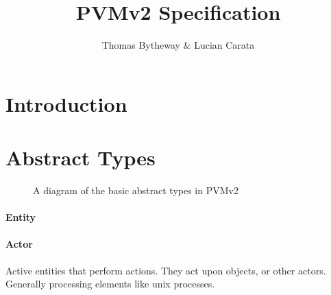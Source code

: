 \documentclass[12pt,twoside,openright,a4paper]{article}
\begin{document}
\title{PVMv2 Specification}
\author{Thomas Bytheway & Lucian Carata}

\begin{minipage}[h]{\textwidth}
    \maketitle
    \vspace{2in}
    {\small}
\end{minipage}

\normalsize



\clearpage

\section{Introduction}

\section{Abstract Types}

\begin{figure}[h]
\centering
{}
\caption{A diagram of the basic abstract types in PVMv2}
\end{figure}

\paragraph{Entity}

\paragraph{Actor}
Active entities that perform actions. They act upon objects, or other actors. Generally processing elements like unix processes.
\end{document}
